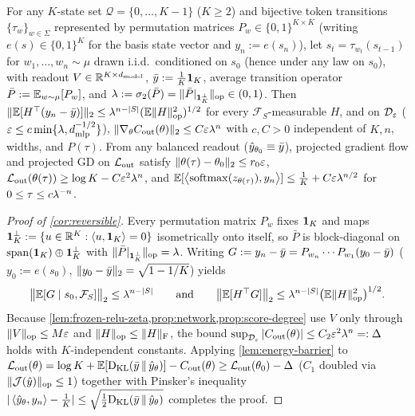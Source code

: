 \begin{corollary}
\label{cor:reversible}
For any $K$-state set $\mathcal Q = \{0,\ldots,K-1\}$ ($K \ge 2$) and bijective token transitions $\{\tau_w\}_{w\in\Sigma}$ represented by permutation matrices $P_w \in \{0,1\}^{K\times K}$ (writing $e(s) \in \{0,1\}^K$ for the basis state vector and $y_n := e(s_n)$), let $s_t = \tau_{w_t}(s_{t-1})$ for $w_1,\ldots,w_n \sim \mu$ drawn i.i.d.\ conditioned on $s_0$ (hence under any law on $s_0$), with readout $V \in \mathbb R^{K\times d_{\mathrm{model}}}$, $\bar y := \frac{1}{K}\mathbf 1_K$, average transition operator $\bar P := \mathbb E_{w\sim\mu}[P_w]$, and $\lambda := \sigma_2(\bar P) = \|\bar P|_{\mathbf 1_K^\perp}\|_{\mathrm{op}} \in (0,1)$. Then $\|\mathbb E[H^\top(y_n - \bar y)]\|_2 \le \lambda^{n-|S|}(\mathbb E\|H\|_{\mathrm{op}}^2)^{1/2}$ for every $\mathcal F_S$-measurable $H$, and on $\mathcal D_{\varepsilon}$ ($\varepsilon \le c\min\{\lambda, d_{\mathrm{mlp}}^{-1/2}\}$), $\|\nabla_\theta C_{\mathrm{out}}(\theta)\|_2 \le C\varepsilon\lambda^n$ with $c, C > 0$ independent of $K, n$, widths, and $P(\tau)$. From any balanced readout ($\hat y_{\theta_0} \equiv \bar y$), projected gradient flow and projected GD on $\mathcal L_{\mathrm{out}}$ satisfy $\|\theta(\tau)-\theta_0\|_2 \le r_0\varepsilon$, $\mathcal L_{\mathrm{out}}(\theta(\tau)) \ge \log K - C\varepsilon^2\lambda^n$, and $\mathbb E[\left\langle \operatorname{softmax}(z_{\theta(\tau)}),y_n\right\rangle] \le \frac{1}{K} + C\varepsilon\lambda^{n/2}$ for $0 \le \tau \le c\lambda^{-n}$.
\end{corollary}
\begin{proof}[Proof of \cref{cor:reversible}]
Every permutation matrix $P_w$ fixes $\mathbf 1_K$ and maps $\mathbf 1_K^\perp := \{u \in \mathbb R^K : \langle u, \mathbf 1_K\rangle = 0\}$ isometrically onto itself, so $\bar P$ is block-diagonal on $\operatorname{span}(\mathbf 1_K)\oplus\mathbf 1_K^\perp$ with $\|\bar P|_{\mathbf 1_K^\perp}\|_{\mathrm{op}} = \lambda$. Writing $G := y_n - \bar y = P_{w_n}\cdots P_{w_1}(y_0 - \bar y)$ ($y_0 := e(s_0)$, $\|y_0 - \bar y\|_2 = \sqrt{1 - 1/K}$) yields
\[
  \bigl\|\mathbb E[G \mid s_0, \mathcal F_S]\bigr\|_2 \le \lambda^{n-|S|}
  \qquad\text{and}\qquad
  \bigl\|\mathbb E[H^\top G]\bigr\|_2 \le \lambda^{n-|S|}\bigl(\mathbb E\|H\|_{\mathrm{op}}^2\bigr)^{1/2}.
\]
Because \cref{lem:frozen-relu-zeta,prop:network,prop:score-degree} use $V$ only through $\|V\|_{\mathrm{op}} \le M\varepsilon$ and $\|H\|_{\mathrm{op}} \le \|H\|_{\mathrm{F}}$, the bound $\sup_{\mathcal D_{\varepsilon}}|C_{\mathrm{out}}(\theta)| \le C_2\varepsilon^2\lambda^n =: \Delta$ holds with $K$-independent constants. Applying \cref{lem:energy-barrier} to $\mathcal L_{\mathrm{out}}(\theta) = \log K + \mathbb E[\mathrm{D}_{\mathrm{KL}}(\bar y \,\|\, \hat y_\theta)] - C_{\mathrm{out}}(\theta) \ge \mathcal L_{\mathrm{out}}(\theta_0) - \Delta$ ($C_1$ doubled via $\|\mathcal J(\hat y)\|_{\mathrm{op}} \le 1$) together with Pinsker's inequality $|\left\langle \hat y_\theta,y_n\right\rangle - \frac{1}{K}| \le \sqrt{\frac{1}{2}\mathrm{D}_{\mathrm{KL}}(\bar y \,\|\, \hat y_\theta)}$ completes the proof.
\end{proof}

